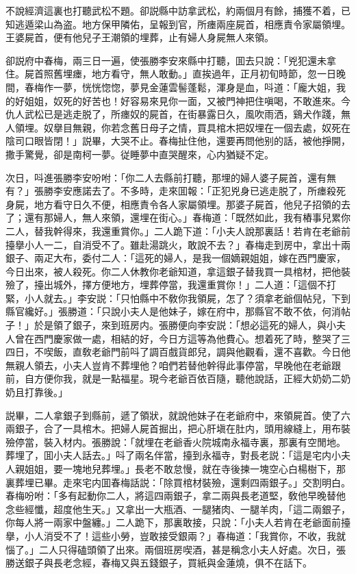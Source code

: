 不說經濟這裏也打聽武松不題。卻説縣中訪拿武松，約兩個月有餘，捕獲不着，已知逃遁梁山為盗。地方保甲隣佑，呈報到官，所瘗兩座屍首，相應責令家屬領埋。王婆屍首，便有他兒子王潮領的埋葬，止有婦人身屍無人來領。

卻説府中春梅，兩三日一遍，使張勝李安來縣中打聽，囬去只說：「兇犯還未拿住。屍首照舊埋瘗，地方看守，無人敢動。」直挨過年，正月初旬時節，忽一日晚間，春梅作一夢，恍恍惚惚，夢見金蓮雲髻蓬鬆，渾身是血，呌道：「龐大姐，我的好姐姐，奴死的好苦也！好容易來見你一面，又被門神把住嗔喝，不敢進來。今仇人武松已是逃走脱了，所瘗奴的屍首，在街暴露日久，風吹雨洒，鷄犬作踐，無人領埋。奴擧目無親，你若念舊日母子之情，買具棺木把奴埋在一個去處，奴死在陰司口眼皆閉！」説畢，大哭不止。春梅扯住他，還要再問他别的話，被他掙開，撒手驚覺，卻是南柯一夢。従睡夢中直哭醒來，心内猶疑不定。

次日，呌進張勝李安吩咐：「你二人去縣前打聽，那埋的婦人婆子屍首，還有無有？」張勝李安應諾去了。不多時，走來囬報：「正犯兇身已逃走脱了，所瘗殺死身屍，地方看守日久不便，相應責令各人家屬領埋。那婆子屍首，他兒子招領的去了；還有那婦人，無人來領，還埋在街心。」春梅道：「既然如此，我有樁事兒累你二人，替我幹得來，我還重賞你。」二人跪下道：「小夫人說那裏話！若肯在老爺前擡擧小人一二，自消受不了。雖赴湯跳火，敢說不去？」春梅走到房中，拿出十兩銀子、兩疋大布，委付二人：「這死的婦人，是我一個嫡親姐姐，嫁在西門慶家，今日出來，被人殺死。你二人休教你老爺知道，拿這銀子替我買一具棺材，把他裝殮了，擡出城外，擇方便地方，埋葬停當，我還重賞你！」二人道：「這個不打緊，小人就去。」李安説：「只怕縣中不敎你我領屍，怎了？須拿老爺個帖兒，下到縣官纔好。」張勝道：「只說小夫人是他妹子，嫁在府中，那縣官不敢不依，何消帖子！」於是領了銀子，來到班房内。張勝便向李安説：「想必這死的婦人，與小夫人曾在西門慶家做一處，相結的好，今日方這等為他費心。想着死了時，整哭了三四日，不喫飯，直敎老爺門前呌了調百戲貨郎兒，調與他觀看，還不喜歡。今日他無親人領去，小夫人豈肯不葬埋他？咱們若替他幹得此事停當，早晚他在老爺跟前，自方便你我，就是一點福星。現今老爺百依百隨，聽他說話，正經大奶奶二奶奶且打靠後。」

説畢，二人拿銀子到縣前，遞了領狀，就說他妹子在老爺府中，來領屍首。使了六兩銀子，合了一具棺木。把婦人屍首掘出，把心肝塡在肚内，頭用線縫上，用布裝殮停當，裝入材内。張勝說：「就埋在老爺香火院城南永福寺裏，那裏有空閒地。葬埋了，囬小夫人話去。」呌了兩名伴當，擡到永福寺，對長老説：「這是宅内小夫人親姐姐，要一塊地兒葬埋。」長老不敢怠慢，就在寺後揀一塊空心白楊樹下，那裏葬埋已畢。走來宅内囬春梅話説：「除買棺材裝殮，還剩四兩銀子。」交割明白。春梅吩咐：「多有起動你二人，將這四兩銀子，拿二兩與長老道堅，敎他早晚替他念些經懺，超度他生天。」又拿出一大瓶酒、一腿猪肉、一腿羊肉，「這二兩銀子，你每人將一兩家中盤纏。」二人跪下，那裏敢接，只說：「小夫人若肯在老爺面前擡擧，小人消受不了！這些小勞，豈敢接受銀兩？」春梅道：「我賞你，不收，我就惱了。」二人只得磕頭領了出來。兩個班房喫酒，甚是稱念小夫人好處。次日，張勝送銀子與長老念經，春梅又與五錢銀子，買紙與金蓮燒，俱不在話下。

